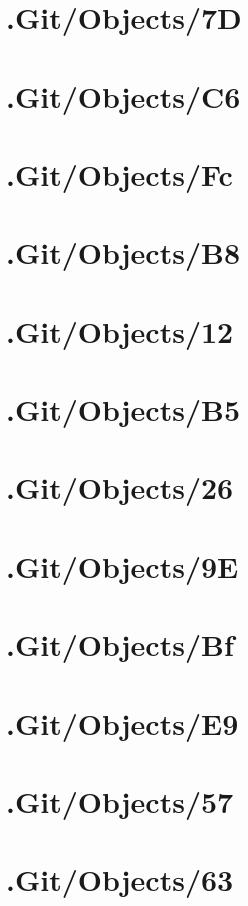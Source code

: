 \section*{.Git/Objects/7D}

\section*{.Git/Objects/C6}

\section*{.Git/Objects/Fc}

\section*{.Git/Objects/B8}

\section*{.Git/Objects/12}

\section*{.Git/Objects/B5}

\section*{.Git/Objects/26}

\section*{.Git/Objects/9E}

\section*{.Git/Objects/Bf}

\section*{.Git/Objects/E9}

\section*{.Git/Objects/57}

\section*{.Git/Objects/63}

